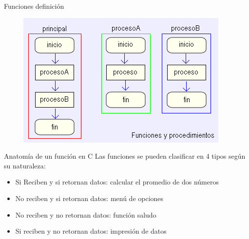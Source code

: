 \documentclass[xcolor=pdftex,table,11pt]{beamer}
\begin{document}
\begin{frame}{Funciones definición}

 \begin{figure}
 \centering
\includegraphics[scale=0.7]{../img/exported/Funciones.png}
\end{figure}

\end{frame}






\begin{frame}[allowframebreaks]{Anatomía de un función en C}
Las funciones se pueden clasificar en 4 tipos según su naturaleza:
\begin{itemize}
\item Si Reciben y si retornan datos: calcular el promedio de dos números
\item No reciben y si retornan datos: menú de opciones
\item No reciben y no retornan datos: función saludo
\item Si reciben y no retornan datos: impresión de datos


\end{itemize}

\end{frame}
\end{document}
